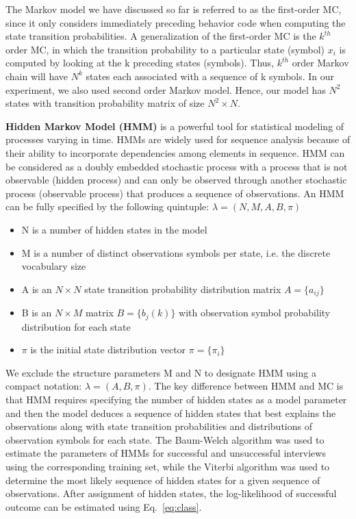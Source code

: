 \documentclass{amia_summit_2018}
\begin{document}
The Markov model we have discussed so far is referred to as the first-order MC, since it only considers immediately preceding behavior code when computing the state transition probabilities. A generalization of the first-order MC is the $k^{th}$ order MC, in which the transition probability to a particular state (symbol) $x_i$ is computed by looking at the k preceding states (symbols). Thus, $k^{th}$ order Markov chain will have $N^{k}$ states each associated with a sequence of k symbols. In our experiment, we also used second order Markov model. Hence, our model has $N^2$ states with transition probability matrix of size $N^2 \times N$.  

\textbf {Hidden Markov Model (HMM)} is a powerful tool for statistical modeling of processes varying in time. HMMs are widely used for sequence analysis because of their ability to incorporate dependencies among elements in sequence. HMM can be considered as a doubly embedded stochastic process with a process that is not observable (hidden process) and can only be observed through another stochastic process (observable process) that produces a sequence of observations. An HMM can be fully specified by the following quintuple: $\lambda = (N, M, A, B, \pi)$
\begin{itemize}
\item N is a number of hidden states in the model
\item M is a number of distinct observations symbols per state, i.e. the discrete vocabulary size
\item A is an $N\times N$ state transition probability distribution matrix $A = \{a_{ij}\}$
\item B is an $N\times M$ matrix $B = \{b_j(k)\}$ with observation symbol probability distribution for each state 
\item $\pi$ is the initial state distribution vector $\pi = \{\pi_i\}$
\end{itemize}
We exclude the structure parameters M and N to designate HMM using a compact notation: $\lambda = (A, B, \pi)$. The key difference between HMM and MC is that HMM requires specifying the number of hidden states as a model parameter and then the model deduces a sequence of hidden states that best explains the observations along with state transition probabilities and distributions of observation symbols for each state. The Baum-Welch algorithm was used to estimate the parameters of HMMs for successful and unsuccessful interviews using the corresponding training set, while the Viterbi algorithm was used to determine the most likely sequence of hidden states for a given sequence of observations. After assignment of hidden states, the log-likelihood of successful outcome can be estimated using Eq.~\ref{eq:class}.
\end{document}
